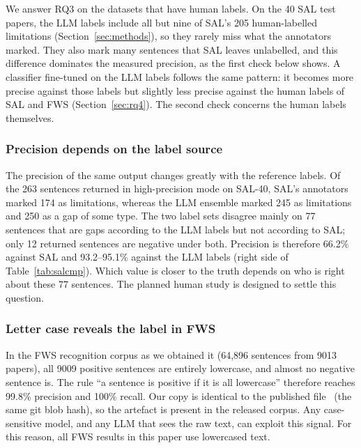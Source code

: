 We answer RQ3 on the datasets that have human labels. On the 40 SAL test papers, the LLM labels include all but nine of SAL's 205 human-labelled limitations (Section~\ref{sec:methods}), so they rarely miss what the annotators marked. They also mark many sentences that SAL leaves unlabelled, and this difference dominates the measured precision, as the first check below shows. A classifier fine-tuned on the LLM labels follows the same pattern: it becomes more precise against those labels but slightly less precise against the human labels of SAL and FWS (Section~\ref{sec:rq4}). The second check concerns the human labels themselves.

\subsubsection{Precision depends on the label source}
\label{sec:label-source}

The precision of the same output changes greatly with the reference labels. Of the 263 sentences returned in high-precision mode on SAL-40, SAL's annotators marked 174 as limitations, whereas the LLM ensemble marked 245 as limitations and 250 as a gap of some type. The two label sets disagree mainly on 77 sentences that are gaps according to the LLM labels but not according to SAL; only 12 returned sentences are negative under both. Precision is therefore 66.2\% against SAL and 93.2--95.1\% against the LLM labels (right side of Table~\ref{tab:salcmp}). Which value is closer to the truth depends on who is right about these 77 sentences. The planned human study is designed to settle this question.


\subsubsection{Letter case reveals the label in FWS}
\label{sec:fws-case}

In the FWS recognition corpus as we obtained it (64,896 sentences from 9013 papers), all 9009 positive sentences are entirely lowercase, and almost no negative sentence is. The rule ``a sentence is positive if it is all lowercase'' therefore reaches 99.8\% precision and 100\% recall. Our copy is identical to the published file~\cite{fwsrepo} (the same git blob hash), so the artefact is present in the released corpus. Any case-sensitive model, and any LLM that sees the raw text, can exploit this signal. For this reason, all FWS results in this paper use lowercased text.
